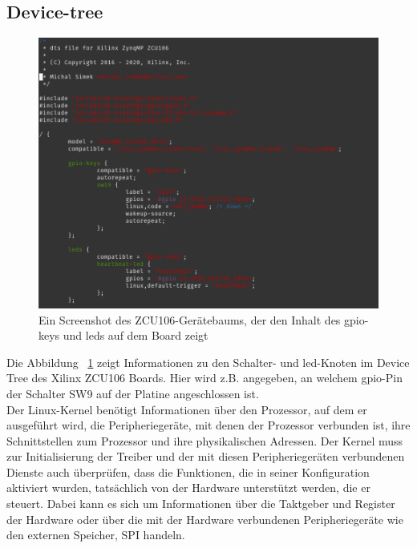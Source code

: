 \subsection{Device-tree}
\begin{figure}[h]
	\begin{center}
		\includegraphics[width=1\textwidth]{./images/device-tree.jpg}
	\end{center}
	\vspace{-5pt}
	\caption[ZCU106-Gerätbaum gpio-keys and leds]{Ein Screenshot des ZCU106-Gerätebaums, der den Inhalt des gpio-keys und leds  auf dem Board zeigt} %
	\label{fig:device:tree}
	\vspace{-5pt}
\end{figure}	
Die Abbildung ~\ref{fig:device:tree} zeigt Informationen zu den Schalter- und led-Knoten im Device Tree des Xilinx ZCU106 Boards. Hier wird z.B. angegeben, an welchem gpio-Pin der Schalter SW9 auf der Platine angeschlossen ist.\\
\cite{Dervis2013}Der Linux-Kernel benötigt Informationen über den Prozessor, auf dem er ausgeführt wird, die Peripheriegeräte, mit denen der Prozessor verbunden ist, ihre Schnittstellen zum Prozessor und ihre physikalischen Adressen. Der Kernel muss zur Initialisierung der Treiber und der mit diesen Peripheriegeräten verbundenen Dienste auch überprüfen, dass die Funktionen, die in seiner Konfiguration aktiviert wurden, tatsächlich von der Hardware unterstützt werden, die er steuert. Dabei kann es sich um Informationen über die Taktgeber und Register der Hardware oder über die mit der Hardware verbundenen Peripheriegeräte wie den externen Speicher, SPI handeln.\\

